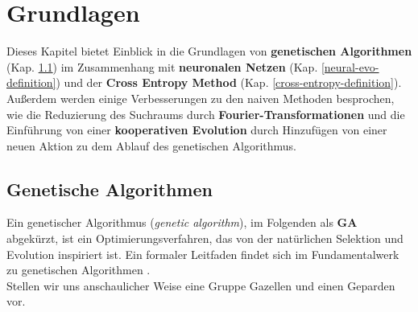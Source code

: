 
\chapter{Grundlagen} \label{basics}

Dieses Kapitel bietet Einblick in die Grundlagen von \textbf{genetischen Algorithmen} (Kap. \ref{ga-my-definition}) im Zusammenhang mit \textbf{neuronalen Netzen} (Kap. \ref{neural-evo-definition}) und der \textbf{Cross Entropy Method} (Kap. \ref{cross-entropy-definition}). Außerdem werden einige Verbesserungen zu den naiven Methoden besprochen, wie die Reduzierung des Suchraums durch \textbf{Fourier-Transformationen} und die Einführung von einer \textbf{kooperativen Evolution} durch Hinzufügen von einer neuen Aktion zu dem Ablauf des genetischen Algorithmus.

    \section{Genetische Algorithmen} \label{ga-my-definition}


        Ein genetischer Algorithmus (\textit{genetic algorithm}), im Folgenden als \textbf{GA} abgekürzt, ist ein Optimierungsverfahren, das von der natürlichen Selektion und Evolution inspiriert ist. Ein formaler Leitfaden findet sich im Fundamentalwerk zu genetischen Algorithmen \cite{ga}.\\[2mm]
        Stellen wir uns anschaulicher Weise eine Gruppe Gazellen und einen Geparden vor.\\

